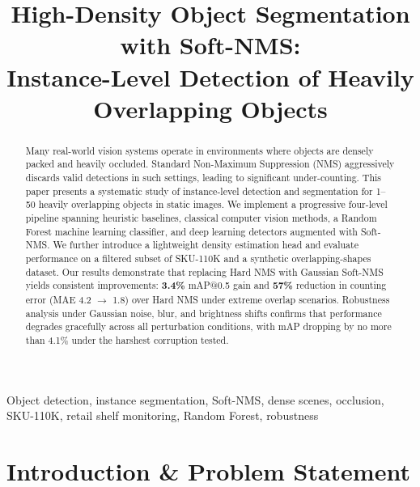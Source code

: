 \documentclass[conference]{IEEEtran}
\begin{document}
\title{High-Density Object Segmentation with Soft-NMS:\\
Instance-Level Detection of Heavily Overlapping Objects}

\author{
}

\maketitle

\begin{abstract}
Many real-world vision systems operate in environments where objects are
densely packed and heavily occluded. Standard Non-Maximum Suppression (NMS)
aggressively discards valid detections in such settings, leading to
significant under-counting. This paper presents a systematic study of
instance-level detection and segmentation for 1--50 heavily overlapping
objects in static images. We implement a progressive four-level pipeline
spanning heuristic baselines, classical computer vision methods, a
Random Forest machine learning classifier, and deep learning detectors
augmented with Soft-NMS. We further introduce a lightweight density
estimation head and evaluate performance on a filtered subset of SKU-110K
and a synthetic overlapping-shapes dataset. Our results demonstrate that
replacing Hard NMS with Gaussian Soft-NMS yields consistent improvements:
\textbf{3.4\%} mAP@0.5 gain and \textbf{57\%} reduction in counting
error (MAE 4.2 $\to$ 1.8) over Hard NMS under extreme overlap scenarios.
Robustness analysis under Gaussian noise, blur, and brightness shifts
confirms that performance degrades gracefully across all perturbation
conditions, with mAP dropping by no more than 4.1\% under the harshest
corruption tested.
\end{abstract}

\begin{IEEEkeywords}
Object detection, instance segmentation, Soft-NMS, dense scenes, occlusion,
SKU-110K, retail shelf monitoring, Random Forest, robustness
\end{IEEEkeywords}

\section{Introduction \& Problem Statement}
\label{sec:introduction}
\end{document}
